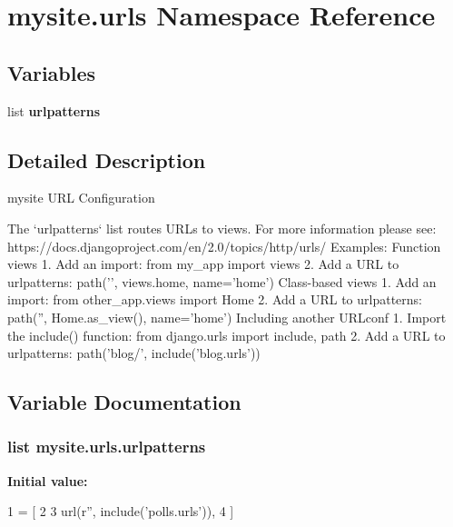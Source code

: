 \hypertarget{namespacemysite_1_1urls}{\section{mysite.\-urls Namespace Reference}
\label{namespacemysite_1_1urls}
}
\subsection*{Variables}
\begin{DoxyCompactItemize}
\item 
list {\bfseries urlpatterns}
\end{DoxyCompactItemize}


\subsection{Detailed Description}
\begin{DoxyVerb}mysite URL Configuration

The `urlpatterns` list routes URLs to views. For more information please see:
https://docs.djangoproject.com/en/2.0/topics/http/urls/
Examples:
Function views
1. Add an import:  from my_app import views
2. Add a URL to urlpatterns:  path('', views.home, name='home')
Class-based views
1. Add an import:  from other_app.views import Home
2. Add a URL to urlpatterns:  path('', Home.as_view(), name='home')
Including another URLconf
1. Import the include() function: from django.urls import include, path
2. Add a URL to urlpatterns:  path('blog/', include('blog.urls'))
\end{DoxyVerb}
 

\subsection{Variable Documentation}
\hypertarget{namespacemysite_1_1urls_a0ee3882cce96849684991a17cb2b04b6}{
\subsubsection[{urlpatterns}]{\setlength{\rightskip}{0pt plus 5cm}list mysite.\-urls.\-urlpatterns}}\label{namespacemysite_1_1urls_a0ee3882cce96849684991a17cb2b04b6}
{\bfseries Initial value\-:}
\begin{DoxyCode}
1 = [
2 
3     url(\textcolor{stringliteral}{r''}, include(\textcolor{stringliteral}{'polls.urls'})),
4 ]
\end{DoxyCode}

